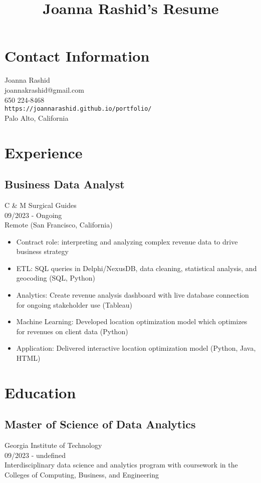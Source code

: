\documentclass{article}
\begin{document}
\title{Joanna Rashid's Resume}
\author{}
\date{}
\maketitle

\section*{Contact Information}
Joanna Rashid \\
joannakrashid@gmail.com \\
650 224-8468 \\
\texttt{https://joannarashid.github.io/portfolio/} \\
Palo Alto, California

\section*{Experience}
\subsection*{Business Data Analyst}
C \& M Surgical Guides \\
09/2023 - Ongoing \\
Remote (San Francisco, California)
\begin{itemize}[leftmargin=*]
    \item Contract role: interpreting and analyzing complex revenue data to drive business strategy
    \item ETL: SQL queries in Delphi/NexusDB, data cleaning, statistical analysis, and geocoding (SQL, Python)
    \item Analytics: Create revenue analysis dashboard with live database connection for ongoing stakeholder use (Tableau)
    \item Machine Learning: Developed location optimization model which optimizes for revenues on client data (Python)
    \item Application: Delivered interactive location optimization model (Python, Java, HTML)
\end{itemize}

\section*{Education}
\subsection*{Master of Science of Data Analytics}
Georgia Institute of Technology \\
09/2023 - undefined \\
Interdisciplinary data science and analytics program with coursework in the Colleges of Computing, Business, and Engineering
\end{document}
